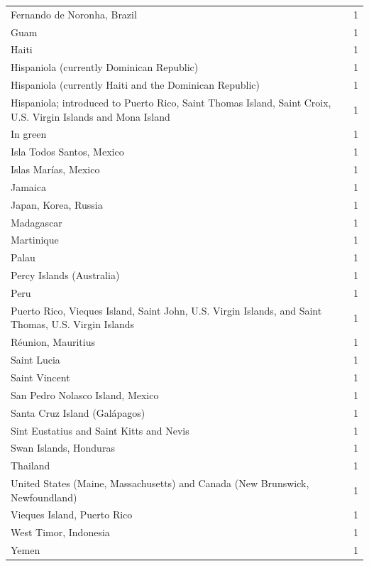 \documentclass[
  letterpaper,
  DIV=11,
  numbers=noendperiod]{scrartcl}
\begin{document}
\begin{table}
\begin{tabular*}{\linewidth}{@{\extracolsep{\fill}}lr}
Fernando de Noronha, Brazil & 1 \\ 
Guam & 1 \\ 
Haiti & 1 \\ 
Hispaniola (currently Dominican Republic) & 1 \\ 
Hispaniola (currently Haiti and the Dominican Republic) & 1 \\ 
Hispaniola; introduced to Puerto Rico, Saint Thomas Island, Saint Croix, U.S. Virgin Islands and Mona Island & 1 \\ 
In green & 1 \\ 
Isla Todos Santos, Mexico & 1 \\ 
Islas Marías, Mexico & 1 \\ 
Jamaica & 1 \\ 
Japan, Korea, Russia & 1 \\ 
Madagascar & 1 \\ 
Martinique & 1 \\ 
Palau & 1 \\ 
Percy Islands (Australia) & 1 \\ 
Peru & 1 \\ 
Puerto Rico, Vieques Island, Saint John, U.S. Virgin Islands, and Saint Thomas, U.S. Virgin Islands & 1 \\ 
Réunion, Mauritius & 1 \\ 
Saint Lucia & 1 \\ 
Saint Vincent & 1 \\ 
San Pedro Nolasco Island, Mexico & 1 \\ 
Santa Cruz Island (Galápagos) & 1 \\ 
Sint Eustatius and Saint Kitts and Nevis & 1 \\ 
Swan Islands, Honduras & 1 \\ 
Thailand & 1 \\ 
United States (Maine, Massachusetts) and Canada (New Brunswick, Newfoundland) & 1 \\ 
Vieques Island, Puerto Rico & 1 \\ 
West Timor, Indonesia & 1 \\ 
Yemen & 1 \\ 
\bottomrule
\end{tabular*}
\end{table}
\end{document}

